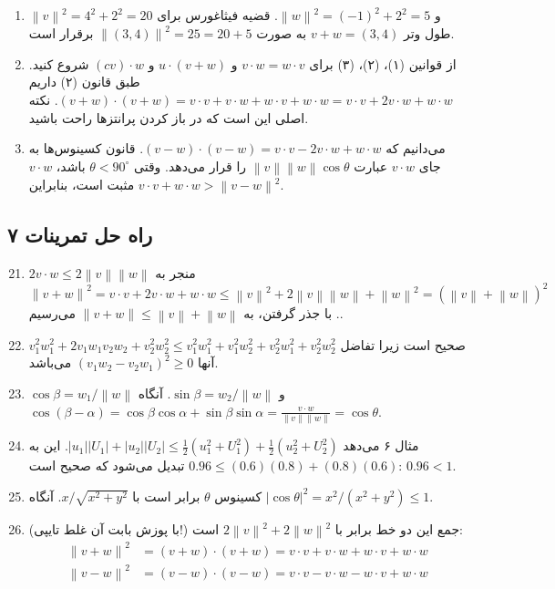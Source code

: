 \documentclass[12pt,a4paper]{article}
\newcommand{\norm}[1]{\left\lVert#1\right\rVert}
\begin{document}
{\begin{enumerate}
			\item $\norm{v}^2 = 4^2+2^2=20$ و $\norm{w}^2=(-1)^2+2^2=5$. قضیه فیثاغورس برای طول وتر $v+w=(3,4)$ به صورت $\norm{(3,4)}^2=25=20+5$ برقرار است.
			
			\item از قوانین (۱)، (۲)، (۳) برای $v \cdot w = w \cdot v$ و $u \cdot (v+w)$ و $(cv) \cdot w$ شروع کنید. طبق قانون (۲) داریم $(v+w) \cdot (v+w) = v \cdot v + v \cdot w + w \cdot v + w \cdot w = v \cdot v + 2v \cdot w + w \cdot w$. نکته اصلی این است که در باز کردن پرانتزها راحت باشید.
			
			\item می‌دانیم که $(v-w) \cdot (v-w) = v \cdot v - 2v \cdot w + w \cdot w$. قانون کسینوس‌ها به جای $v \cdot w$ عبارت $\norm{v} \norm{w} \cos\theta$ را قرار می‌دهد. وقتی $\theta < 90^\circ$ باشد، $v \cdot w$ مثبت است، بنابراین $v \cdot v + w \cdot w > \norm{v-w}^2$.
		\end{enumerate}
		
		\subsection*{راه حل تمرینات ۷}
		\begin{enumerate}
			\setcounter{enumi}{20}
			\item $2v \cdot w \le 2\norm{v} \norm{w}$ منجر به $\norm{v+w}^2 = v \cdot v + 2v \cdot w + w \cdot w \le \norm{v}^2 + 2\norm{v}\norm{w} + \norm{w}^2 = (\norm{v}+\norm{w})^2$. با جذر گرفتن، به $\norm{v+w} \le \norm{v}+\norm{w}$ می‌رسیم.
			
			\item $v_1^2w_1^2 + 2v_1w_1v_2w_2 + v_2^2w_2^2 \le v_1^2w_1^2 + v_1^2w_2^2 + v_2^2w_1^2 + v_2^2w_2^2$ صحیح است زیرا تفاضل آنها $(v_1w_2 - v_2w_1)^2 \ge 0$ می‌باشد.
			
			\item $\cos\beta = w_1/\norm{w}$ و $\sin\beta=w_2/\norm{w}$. آنگاه $\cos(\beta-\alpha) = \cos\beta\cos\alpha+\sin\beta\sin\alpha = \frac{v \cdot w}{\norm{v}\norm{w}} = \cos\theta$.
			
			\item مثال ۶ می‌دهد $|u_1||U_1| + |u_2||U_2| \le \frac{1}{2}(u_1^2+U_1^2) + \frac{1}{2}(u_2^2+U_2^2)$. این به $0.96 \le (0.6)(0.8)+(0.8)(0.6)$ تبدیل می‌شود که صحیح است: $0.96 < 1$.
			
			\item کسینوس $\theta$ برابر است با $x/\sqrt{x^2+y^2}$. آنگاه $|\cos\theta|^2 = x^2/(x^2+y^2) \le 1$.
			
			\item (با پوزش بابت آن غلط تایپی!) جمع این دو خط برابر با $2\norm{v}^2+2\norm{w}^2$ است:
			\begin{align*}
				\norm{v+w}^2 &= (v+w)\cdot(v+w) = v\cdot v + v\cdot w + w\cdot v + w\cdot w \\
				\norm{v-w}^2 &= (v-w)\cdot(v-w) = v\cdot v - v\cdot w - w\cdot v + w\cdot w
			\end{align*}
			

\end{enumerate}}
\end{document}
